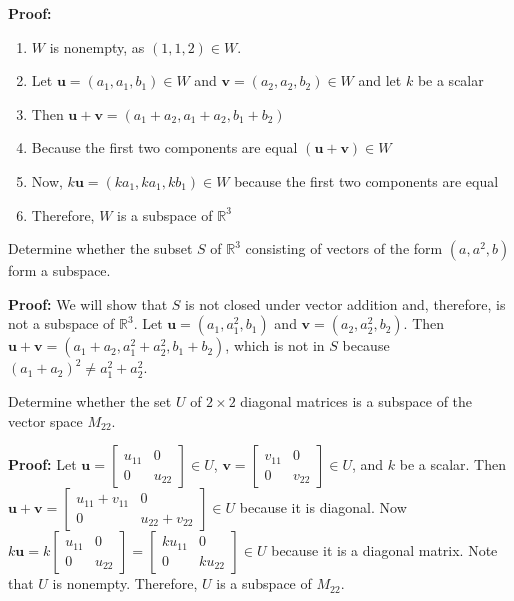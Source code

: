 \documentclass{report}
\begin{document}
\textbf{Proof:}
\begin{enumerate}
    \item $W$ is nonempty, as $(1,1,2) \in W$.
    \item Let $\bm{u}=(a_1,a_1,b_1) \in W$ and $\bm{v} = (a_2,a_2,b_2) \in W$ and let $k$ be a scalar
    \item Then $\bm{u} + \bm{v}=(a_1 + a_2, a_1 + a_2, b_1 + b_2)$
    \item Because the first two components are equal $(\bm{u} + \bm{v}) \in W$
    \item Now, $k\bm{u}=(ka_1, ka_1, kb_1) \in W$ because the first two components are equal
    \item Therefore, $W$ is a subspace of $\mathbb{R}^3$
\end{enumerate}

\begin{tcolorbox}[colframe = lightred]

 Determine whether the subset $S$ of $\mathbb{R}^3$ consisting of vectors of the form $(a,a^2,b)$ form a subspace.\\

\end{tcolorbox}

\textbf{Proof:} We will show that $S$ is not closed under vector addition and, therefore, is not a subspace of $\mathbb{R}^3$. Let $\bm{u}=\left( a_1, a_1^2, b_1 \right)$ and $\bm{v}=\left( a_2, a_2^2, b_2 \right)$. Then $\bm{u} + \bm{v} = \left( a_1 + a_2, a_1^2 + a_2^2 , b_1 + b_2\right)$, which is not in $S$ because $(a_1 + a_2)^2 \ne a_1^2 + a_2^2$. \\



\begin{tcolorbox}[colframe = lightred]

 Determine whether the set $U$ of $2 \times 2$ diagonal matrices is a subspace of the vector space $M_{22}$.\\

\end{tcolorbox}

\textbf{Proof:} Let $\bm{u} = \begin{bmatrix} u_{11} & 0 \\ 0 & u_{22} \end{bmatrix} \in U$, $\bm{v}=\begin{bmatrix} v_{11} & 0 \\ 0 & v_{22} \end{bmatrix} \in U$, and $k$ be a scalar. Then $\bm{u}+\bm{v} = \begin{bmatrix} u_{11} + v_{11} & 0 \\ 0 & u_{22} + v_{22} \end{bmatrix} \in U$ because it is diagonal. Now $k\bm{u} = k \begin{bmatrix} u_{11} & 0 \\ 0 & u_{22} \end{bmatrix} = \begin{bmatrix} ku_{11} & 0 \\ 0 & ku_{22} \end{bmatrix} \in U$ because it is a diagonal matrix. Note that $U$ is nonempty. Therefore, $U$ is a subspace of $M_{22}$.
\end{document}
